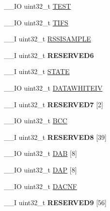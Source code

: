 \begin{DoxyCompactItemize}
\item 
\+\_\+\+\_\+\+I\+O uint32\+\_\+t \hyperlink{struct_n_r_f___r_a_d_i_o___type_a3d2638805c6a50e1d0a94591d65d4312}{T\+E\+S\+T}
\item 
\+\_\+\+\_\+\+I\+O uint32\+\_\+t \hyperlink{struct_n_r_f___r_a_d_i_o___type_a9767b2f76442755ffd041f2cf81a5e1b}{T\+I\+F\+S}
\item 
\+\_\+\+\_\+\+I uint32\+\_\+t \hyperlink{struct_n_r_f___r_a_d_i_o___type_ad446c3cbe23b016bf15412c61da47dd1}{R\+S\+S\+I\+S\+A\+M\+P\+L\+E}
\item 
\hypertarget{struct_n_r_f___r_a_d_i_o___type_a5f0f0c40e17c99d13d397b6163bb0ec6}{}\+\_\+\+\_\+\+I uint32\+\_\+t {\bfseries R\+E\+S\+E\+R\+V\+E\+D6}\label{struct_n_r_f___r_a_d_i_o___type_a5f0f0c40e17c99d13d397b6163bb0ec6}

\item 
\+\_\+\+\_\+\+I uint32\+\_\+t \hyperlink{struct_n_r_f___r_a_d_i_o___type_ae278ba1e12cd8d16c45e4c362a11019e}{S\+T\+A\+T\+E}
\item 
\+\_\+\+\_\+\+I\+O uint32\+\_\+t \hyperlink{struct_n_r_f___r_a_d_i_o___type_a19647347715a11d0e4dfe208a1a4fa18}{D\+A\+T\+A\+W\+H\+I\+T\+E\+I\+V}
\item 
\hypertarget{struct_n_r_f___r_a_d_i_o___type_ab63765aaf5d62f0bbf73183268563532}{}\+\_\+\+\_\+\+I uint32\+\_\+t {\bfseries R\+E\+S\+E\+R\+V\+E\+D7} \mbox{[}2\mbox{]}\label{struct_n_r_f___r_a_d_i_o___type_ab63765aaf5d62f0bbf73183268563532}

\item 
\+\_\+\+\_\+\+I\+O uint32\+\_\+t \hyperlink{struct_n_r_f___r_a_d_i_o___type_afd311c3f7297573912faf52266dee214}{B\+C\+C}
\item 
\hypertarget{struct_n_r_f___r_a_d_i_o___type_a4826a60f1ec157821725aaf6e76470d6}{}\+\_\+\+\_\+\+I uint32\+\_\+t {\bfseries R\+E\+S\+E\+R\+V\+E\+D8} \mbox{[}39\mbox{]}\label{struct_n_r_f___r_a_d_i_o___type_a4826a60f1ec157821725aaf6e76470d6}

\item 
\+\_\+\+\_\+\+I\+O uint32\+\_\+t \hyperlink{struct_n_r_f___r_a_d_i_o___type_aacd3ca05a0341b964916a15d5ec23382}{D\+A\+B} \mbox{[}8\mbox{]}
\item 
\+\_\+\+\_\+\+I\+O uint32\+\_\+t \hyperlink{struct_n_r_f___r_a_d_i_o___type_a71e30b6bc99e2f5f716a1c52faf859d5}{D\+A\+P} \mbox{[}8\mbox{]}
\item 
\+\_\+\+\_\+\+I\+O uint32\+\_\+t \hyperlink{struct_n_r_f___r_a_d_i_o___type_a0689314a66b480c89b5102c3d7558a5f}{D\+A\+C\+N\+F}
\item 
\hypertarget{struct_n_r_f___r_a_d_i_o___type_aaefb9f3b73778a3ad3ad7af74251dfca}{}\+\_\+\+\_\+\+I uint32\+\_\+t {\bfseries R\+E\+S\+E\+R\+V\+E\+D9} \mbox{[}56\mbox{]}\label{struct_n_r_f___r_a_d_i_o___type_aaefb9f3b73778a3ad3ad7af74251dfca}


\end{DoxyCompactItemize}

